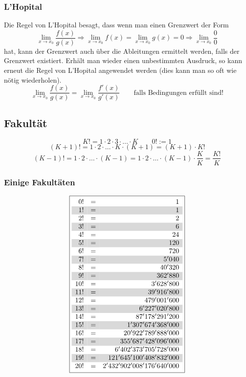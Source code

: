 \subsubsection{L'Hopital}
Die Regel von L'Hopital besagt, dass wenn man einen Grenzwert der Form 
\[ \lim\limits_{x \rightarrow x_0} \frac{f(x)}{g(x)} \Rightarrow \lim\limits_{x \rightarrow x_0} f(x) = \lim\limits_{x \rightarrow x_0} g(x) = 0 \Rightarrow \lim\limits_{x \rightarrow x_0} \frac{0}{0} \] hat, kann der Grenzwert auch über die Ableitungen ermittelt werden, falls der Grenzwert existiert.
Erhält man wieder einen unbestimmten Ausdruck, so kann erneut die Regel von L'Hopital angewendet werden (dies kann man so oft wie nötig wiederholen).
\[ \boxed{ \lim\limits_{x \rightarrow x_0} \frac{f(x)}{g(x)} = \lim\limits_{x \rightarrow x_0} \frac{f'(x)}{g'(x)} \quad} \quad \text{falls Bedingungen erfüllt sind!}\]

\subsection{Fakultät}
\[ \boxed{K! = 1 \cdot 2 \cdot 3\cdot \ldots \cdot K} \qquad \boxed{0! := 1} \]
\[ \boxed{(K + 1)! = 1  \cdot 2 \cdot \ldots \cdot K \cdot (K + 1) = (K + 1) \cdot K!} \]
\[ \boxed{(K - 1)! = 1  \cdot 2 \cdot \ldots \cdot (K - 1) = 1  \cdot 2 \cdot \ldots \cdot (K - 1) \cdot \frac{K}{K} = \frac{K!}{K}} \]
\subsubsection{Einige Fakultäten}
\[ \boxed{\begin{array}{rcr}
\rowcolor{white}  0!&=&1\\
\rowcolor{lgray}  1!&=&1\\
\rowcolor{white}  2!&=&2\\
\rowcolor{lgray}  3!&=&6\\
\rowcolor{white}  4!&=&24\\
\rowcolor{lgray}  5!&=&120\\
\rowcolor{white}  6!&=&720\\
\rowcolor{lgray}  7!&=&5'040\\
\rowcolor{white}  8!&=&40'320\\
\rowcolor{lgray}  9!&=&362'880\\
\rowcolor{white} 10!&=&3'628'800\\
\rowcolor{lgray} 11!&=&39'916'800\\
\rowcolor{white} 12!&=&479'001'600\\
\rowcolor{lgray} 13!&=&6'227'020'800\\
\rowcolor{white} 14!&=&87'178'291'200\\
\rowcolor{lgray} 15!&=&1'307'674'368'000\\
\rowcolor{white} 16!&=&20'922'789'888'000\\
\rowcolor{lgray} 17!&=&355'687'428'096'000\\
\rowcolor{white} 18!&=&6'402'373'705'728'000\\
\rowcolor{lgray} 19!&=&121'645'100'408'832'000\\
\rowcolor{white} 20!&=&2'432'902'008'176'640'000\\
\end{array}}\]